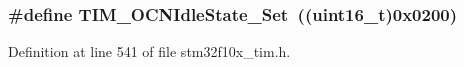 \subsubsection[{\texorpdfstring{T\+I\+M\+\_\+\+O\+C\+N\+Idle\+State\+\_\+\+Set}{TIM_OCNIdleState_Set}}]{\setlength{\rightskip}{0pt plus 5cm}\#define T\+I\+M\+\_\+\+O\+C\+N\+Idle\+State\+\_\+\+Set~(({\bf uint16\+\_\+t})0x0200)}\hypertarget{group___t_i_m___output___compare___n___idle___state_ga980392da6eb5bedcbf7ed353e1073f99}{}\label{group___t_i_m___output___compare___n___idle___state_ga980392da6eb5bedcbf7ed353e1073f99}


Definition at line 541 of file stm32f10x\+\_\+tim.\+h.

